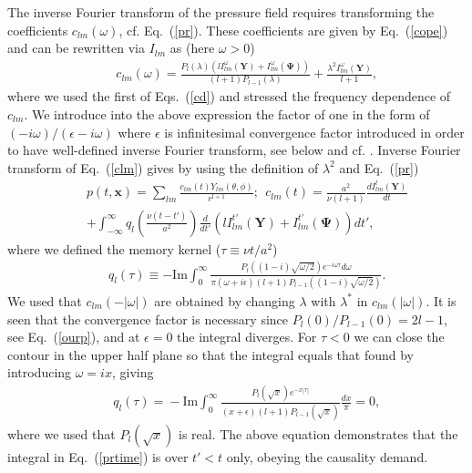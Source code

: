\documentclass[aps,prx,twocolumn,amsmath,amssymb,amsfonts]{revtex4-2}
\newcommand{\rIm}{\mathrm{Im}}
\begin{document}
The inverse Fourier transform of the pressure field requires transforming the coefficients $c_{lm}(\omega)$, cf. Eq.~(\ref{pr}). These coefficients are given by Eq.~(\ref{cope}) and can be rewritten via $I_{lm}$ as (here $\omega>0$)
\begin{eqnarray}&&\!\!\!\!\!
c_{lm}(\omega)\!=\! \frac{P_l(\lambda)\left(l I_{lm}^{\omega}(\bm Y)\!+\!I_{lm}^{\omega}(\bm \Psi)\right)}{(l\!+\!1)P_{l-1}(\lambda)} +\!\frac{\lambda^2 I_{lm}^{\omega}(\bm Y)}{l\!+\!1}, \label{clm}
\end{eqnarray}
where we used the first of Eqs.~(\ref{cd}) and stressed the frequency dependence of $c_{lm}$. We introduce into the above expression the factor of one in the form of $(-i\omega)/(\epsilon-i\omega)$ where $\epsilon$ is infinitesimal convergence factor introduced in order to have well-defined inverse Fourier transform, see below and cf. \cite{LL}. Inverse Fourier transform of Eq.~(\ref{clm}) gives by using the definition of $\lambda^2$ and Eq.~(\ref{pr})
\begin{eqnarray}&&
p(t, \bm x)\!=\!\sum_{lm}\!\frac{c_{lm}(t)Y_{lm}(\theta, \phi)}{r^{l+1}};\ \ c_{lm}(t)\!=\!\frac{a^2}{\nu(l\!+\!1)}\frac{dI_{lm}^{t}(\bm Y)}{dt}
\nonumber\\&&
+\int_{-\infty}^{\infty}q_l\left(\frac{\nu(t\!-\!t')}{a^2}\right)\frac{d}{dt'} \left(l I_{lm}^{t'}(\bm Y)\!+\!I_{lm}^{t'}(\bm \Psi)\right)dt',\label{prtime}
\end{eqnarray}
where we defined the memory kernel ($\tau\equiv \nu t/a^2$)
\begin{eqnarray}&&\!\!\!\!\!\!\!\!
q_l(\tau)\equiv - \rIm \int_{0}^{\infty}\!\!  \frac{P_l\left((1-i)\sqrt{\omega/2}\right) e^{-i \omega \tau} d\omega}{\pi(\omega\!+\!i\epsilon)(l\!+\!1)P_{l-1}\left((1\!-\!i)\sqrt{\omega/2}\right)}.\label{ist}
\end{eqnarray}
We used that $c_{lm}(-|\omega|)$ are obtained by changing $\lambda$ with $\lambda^*$ in $c_{lm}(|\omega|)$. It is seen that the convergence factor is necessary since $P_l(0)/P_{l-1}(0)=2l-1$, see Eq.~(\ref{ourp}), and at $\epsilon=0$ the integral diverges. For $\tau<0$ we can close the contour in the upper half plane so that the integral equals that found by introducing $\omega=ix$, giving
\begin{eqnarray}&&\!\!\!
q_l(\tau)\!=\!-\rIm \int_{0}^{\infty}\!\frac{P_l(\sqrt{x}) e^{- x|\tau|}}{(x\!+\!\epsilon)(l+1)P_{l-1}(\sqrt{x})}\frac{dx}{\pi}\!=\!0,
\end{eqnarray}
where we used that $P_l(\sqrt{x})$ is real. The above equation demonstrates that the integral in Eq.~(\ref{prtime}) is over $t'<t$ only, obeying the causality demand.
\end{document}

